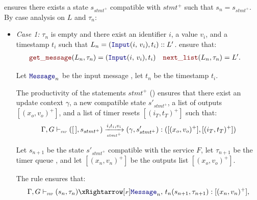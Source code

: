 \begin{skippableproof}
\begin{itemize}
               ensures there exists a state
              $s_{stmt^+}$ compatible with $stmt^+$ such that $s_n = s_{stmt^+}$.
              By case analysis on $L$ and $\tau_n$:
              \begin{itemize}
                  \item \textit{Case 1:} $\tau_n$ is empty and there exist an identifier $i$, a
                        value $v_i$, and a timestamp $t_i$ such that $L_n =  (\inputMess{i}{v_i},
                            t_i) :: L'$.
                        ensure that:
                        \begin{align*}
                            \getMess{L_n}{\tau_n}  & = (\inputMess{i}{v_i}, t_i) &
                            \nextList{L_n}{\tau_n} & = L'.
                        \end{align*}

                        Let $\mess_n$ be the input message , let $t_n$ be the
                        timestamp $t_i$.

                        The productivity of the statements $stmt^+$ () ensures that there exist an update context
                        $\gamma$, a new compatible state $s'_{stmt^+}$, a list of outputs $[(x_o,
                                    v_o)^+]$, and a list of timer resets $[(i_T, t_T)^+]$ such that:
                        \begin{equation*}
                            \Gamma, G \vdash_{\textnormal{\tiny\textsc{frp}}} ([\,], s_{stmt^+}) \xrightarrow[\mbox{\tiny\ensuremath{stmt^+}}]{i, t_i, v_i} (\gamma, s'_{stmt^+}): ([(x_o, v_o)^+], [(i_T, t_T)^+])
                        \end{equation*}

                        Let $s_{n+1}$ be the state $s'_{stmt^+}$ compatible with the service $F$,
                        let $\tau_{n+1}$ be the timer queue , and let
                        $[(x_n, v_n)^+]$ be the outputs list $[(x_o, v_o)^+]$.

                        The rule  ensures
                        that:
                        \begin{equation*}
                            \serviceOpSem{s_n}{\tau_n}{F}{\mess_n}{t_n}{s_{n+1}}{\tau_{n+1}}{(x_n, v_n)^+},
                        \end{equation*}


\end{itemize}
\end{itemize}
\end{skippableproof}
